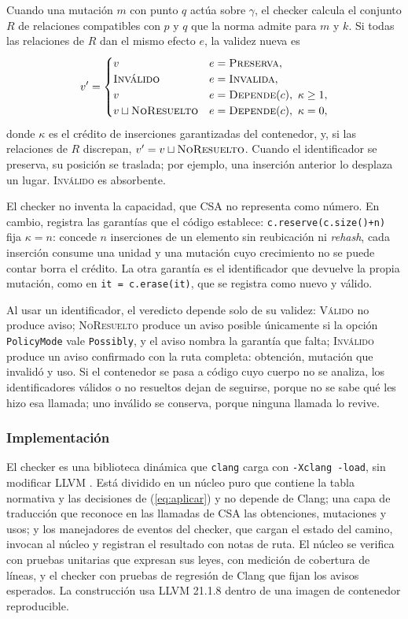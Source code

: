\documentclass[conference]{IEEEtran}
\newcommand{\code}[1]{\texttt{#1}}
\begin{document}
Cuando una mutación $m$ con punto $q$ actúa sobre $\gamma$, el checker calcula el conjunto $R$ de relaciones compatibles con $p$ y $q$ que la norma admite para $m$ y $k$. Si todas las relaciones de $R$ dan el mismo efecto $e$, la validez nueva es
\begin{equation}
v' =
\begin{cases}
v & e=\textsc{Preserva},\\
\textsc{Inválido} & e=\textsc{Invalida},\\
v & e=\textsc{Depende}(c),\ \kappa \geq 1,\\
v \sqcup \textsc{NoResuelto} & e=\textsc{Depende}(c),\ \kappa = 0,
\end{cases}
\label{eq:aplicar}
\end{equation}
donde $\kappa$ es el crédito de inserciones garantizadas del contenedor,
y, si las relaciones de $R$ discrepan, $v'=v \sqcup \textsc{NoResuelto}$. Cuando el identificador se preserva, su posición se traslada; por ejemplo, una inserción anterior lo desplaza un lugar. \textsc{Inválido} es absorbente.

El checker no inventa la capacidad, que CSA no representa como número. En cambio, registra las garantías que el código establece: \code{c.reserve(c.size()+n)} fija $\kappa=n$: concede $n$ inserciones de un elemento sin reubicación ni \textit{rehash}, cada inserción consume una unidad y una mutación cuyo crecimiento no se puede contar borra el crédito. La otra garantía es el identificador que devuelve la propia mutación, como en \code{it = c.erase(it)}, que se registra como nuevo y válido.

Al usar un identificador, el veredicto depende solo de su validez: \textsc{Válido} no produce aviso; \textsc{NoResuelto} produce un aviso posible únicamente si la opción \code{PolicyMode} vale \code{Possibly}, y el aviso nombra la garantía que falta; \textsc{Inválido} produce un aviso confirmado con la ruta completa: obtención, mutación que invalidó y uso. Si el contenedor se pasa a código cuyo cuerpo no se analiza, los identificadores válidos o no resueltos dejan de seguirse, porque no se sabe qué les hizo esa llamada; uno inválido se conserva, porque ninguna llamada lo revive.



\subsubsection{Implementación}
El checker es una biblioteca dinámica que \code{clang} carga con \code{-Xclang -load}, sin modificar LLVM \cite{lattner04}. Está dividido en un núcleo puro que contiene la tabla normativa y las decisiones de (\ref{eq:aplicar}) y no depende de Clang; una capa de traducción que reconoce en las llamadas de CSA las obtenciones, mutaciones y usos; y los manejadores de eventos del checker, que cargan el estado del camino, invocan al núcleo y registran el resultado con notas de ruta. El núcleo se verifica con pruebas unitarias que expresan sus leyes, con medición de cobertura de líneas, y el checker con pruebas de regresión de Clang que fijan los avisos esperados. La construcción usa LLVM 21.1.8 dentro de una imagen de contenedor reproducible.
\end{document}
